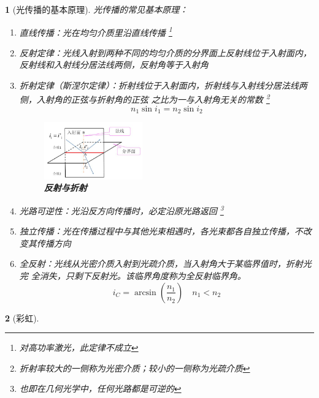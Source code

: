 \documentclass[UTF8]{report}
\theoremstyle{MyLineTheoremStyle} %
\theoremstyle{MyBlockTheoremStyle} %
\theoremstyle{MySubsubsectionStyle} %
\newtheorem{definition}{}
\begin{document}
\begin{definition}[光传播的基本原理]
光传播的常见基本原理：
\begin{enumerate}
    \item 直线传播：光在均匀介质里沿直线传播 \footnote{对高功率激光，此定律不成立}
    \item 反射定律：光线入射到两种不同的均匀介质的分界面上反射线位于入射面内，反射线和入射线分居法线两侧，反射角等于入射角
    \item 折射定律（斯涅尔定律）：折射线位于入射面内，折射线与入射线分居法线两侧，入射角的正弦与折射角的正弦
    之比为一与入射角无关的常数 \footnote{折射率较大的一侧称为光密介质；较小的一侧称为光疏介质}
    \begin{equation}
    n_1\sin i_1 = n_2 \sin i_2
    \end{equation}
    
    \begin{figure}[H]\centering
    \includegraphics[width=0.4\textwidth]{assets/image (44).jpg}
    \caption{\textbf{反射与折射}}\label{反射与折射}
    \end{figure}
    
    \item 光路可逆性：光沿反方向传播时，必定沿原光路返回 \footnote{也即在几何光学中，任何光路都是可逆的}
    \item 独立传播：光在传播过程中与其他光束相遇时，各光束都各自独立传播，不改变其传播方向
    \item 全反射：光线从光密介质入射到光疏介质，当入射角大于某临界值时，折射光完
    全消失，只剩下反射光。该临界角度称为全反射临界角。
    \begin{equation}
    i_C = \arcsin (\frac{n_1}{n_2})\quad n_1<n_2
    \end{equation}
\end{enumerate}
\end{definition}


\begin{definition}[彩虹]
\end{definition}
\end{document}

